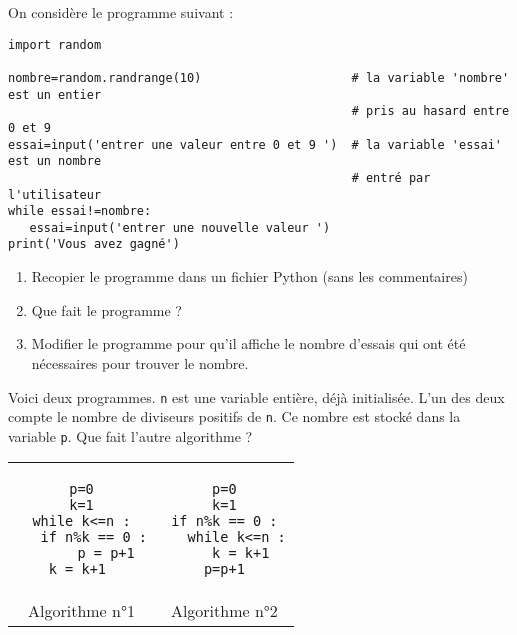 \begin{exercice}
On consid\` ere le programme suivant : 
\begin{verbatim}
import random

nombre=random.randrange(10)                     # la variable 'nombre' est un entier 
                                                # pris au hasard entre 0 et 9
essai=input('entrer une valeur entre 0 et 9 ')  # la variable 'essai' est un nombre 
                                                # entré par l'utilisateur
while essai!=nombre:
   essai=input('entrer une nouvelle valeur ')
print('Vous avez gagné')	
\end{verbatim}
\begin{enumerate}
\item Recopier le programme dans un fichier Python (sans les commentaires)
\item Que fait le programme ?
\item Modifier le programme pour qu'il affiche le nombre d'essais qui ont \' et\' e n\' ecessaires pour trouver le nombre.
\end{enumerate}
\end{exercice}
\bigskip






\begin{exercice}
Voici deux programmes. \verb?n? est une variable entière, déjà initialisée. L'un des deux compte le nombre de diviseurs positifs de \verb?n?. Ce nombre est stock\' e dans la variable \verb?p?. Que fait l'autre algorithme ?
\begin{center}
\begin{tabular}{cc}
\begin{minipage}{7cm}
\begin{verbatim}
p=0
k=1
while k<=n :
   if n%k == 0 :
      p = p+1
   k = k+1    
\end{verbatim}
\end{minipage}\hspace{1cm} 
&
\begin{minipage}{7cm}
\begin{verbatim}
p=0
k=1
if n%k == 0 :
   while k<=n :
      k = k+1  
   p=p+1   
\end{verbatim}
\end{minipage}\\
Algorithme n°1 & Algorithme n°2
\end{tabular}
\end{center}
\end{exercice}
\bigskip



